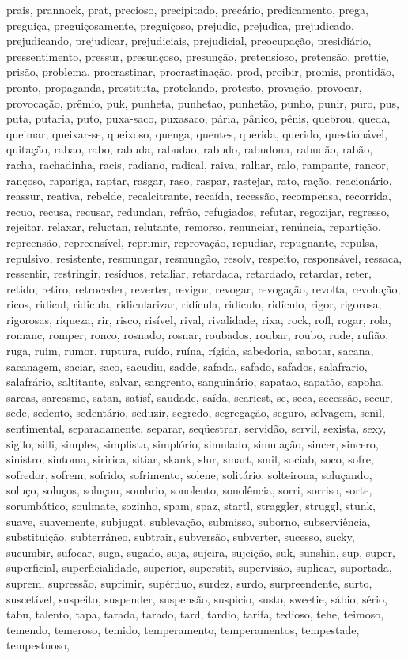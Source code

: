 prais, prannock, prat, precioso, precipitado, precário, predicamento, prega, preguiça, preguiçosamente, preguiçoso, prejudic, prejudica, prejudicado, prejudicando, prejudicar, prejudiciais, prejudicial, preocupação, presidiário, pressentimento, pressur, presunçoso, presunção, pretensioso, pretensão, prettie, prisão, problema, procrastinar, procrastinação, prod, proibir, promis, prontidão, pronto, propaganda, prostituta, protelando, protesto, provação, provocar, provocação, prêmio, puk, punheta, punhetao, punhetão, punho, punir, puro, pus, puta, putaria, puto, puxa-saco, puxasaco, pária, pânico, pênis, quebrou, queda, queimar, queixar-se, queixoso, quenga, quentes, querida, querido, questionável, quitação, rabao, rabo, rabuda, rabudao, rabudo, rabudona, rabudão, rabão, racha, rachadinha, racis, radiano, radical, raiva, ralhar, ralo, rampante, rancor, rançoso, rapariga, raptar, rasgar, raso, raspar, rastejar, rato, ração, reacionário, reassur, reativa, rebelde, recalcitrante, recaída, recessão, recompensa, recorrida, recuo, recusa, recusar, redundan, refrão, refugiados, refutar, regozijar, regresso, rejeitar, relaxar, reluctan, relutante, remorso, renunciar, renúncia, repartição, repreensão, repreensível, reprimir, reprovação, repudiar, repugnante, repulsa, repulsivo, resistente, resmungar, resmungão, resolv, respeito, responsável, ressaca, ressentir, restringir, resíduos, retaliar, retardada, retardado, retardar, reter, retido, retiro, retroceder, reverter, revigor, revogar, revogação, revolta, revolução, ricos, ridicul, ridicula, ridicularizar, ridícula, ridículo, ridículo, rigor, rigorosa, rigorosas, riqueza, rir, risco, risível, rival, rivalidade, rixa, rock, rofl, rogar, rola, romanc, romper, ronco, rosnado, rosnar, roubados, roubar, roubo, rude, rufião, ruga, ruim, rumor, ruptura, ruído, ruína, rígida, sabedoria, sabotar, sacana, sacanagem, saciar, saco, sacudiu, sadde, safada, safado, safados, salafrario, salafrário, saltitante, salvar, sangrento, sanguinário, sapatao, sapatão, sapoha, sarcas, sarcasmo, satan, satisf, saudade, saída, scariest, se, seca, secessão, secur, sede, sedento, sedentário, seduzir, segredo, segregação, seguro, selvagem, senil, sentimental, separadamente, separar, seqüestrar, servidão, servil, sexista, sexy, sigilo, silli, simples, simplista, simplório, simulado, simulação, sincer, sincero, sinistro, sintoma, siririca, sitiar, skank, slur, smart, smil, sociab, soco, sofre, sofredor, sofrem, sofrido, sofrimento, solene, solitário, solteirona, soluçando, soluço, soluços, soluçou, sombrio, sonolento, sonolência, sorri, sorriso, sorte, sorumbático, soulmate, sozinho, spam, spaz, startl, straggler, struggl, stunk, suave, suavemente, subjugat, sublevação, submisso, suborno, subserviência, substituição, subterrâneo, subtrair, subversão, subverter, sucesso, sucky, sucumbir, sufocar, suga, sugado, suja, sujeira, sujeição, suk, sunshin, sup, super, superficial, superficialidade, superior, superstit, supervisão, suplicar, suportada, suprem, supressão, suprimir, supérfluo, surdez, surdo, surpreendente, surto, suscetível, suspeito, suspender, suspensão, suspicio, susto, sweetie, sábio, sério, tabu, talento, tapa, tarada, tarado, tard, tardio, tarifa, tedioso, tehe, teimoso, temendo, temeroso, temido, temperamento, temperamentos, tempestade, tempestuoso, 
